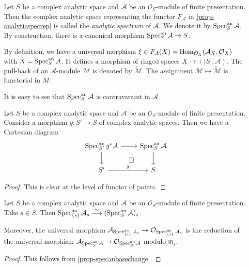 \begin{definition}
    Let $S$ be a complex analytic space and $\mathcal{A}$ be an $\mathcal{O}_S$-module of finite presentation. Then the complex analytic space representing the functor $F_{\mathcal{A}}$ in \cref{prop-analyticspecrep} is called the \emph{analytic spectrum} of $\mathcal{A}$. We denote it by $\operatorname{Spec}^{\mathrm{an}}_S \mathcal{A}$. By construction, there is a canonical morphism $\operatorname{Spec}^{\mathrm{an}}_S \mathcal{A}\rightarrow S$.

    By definition, we have a universal morphism $\xi\in F_{\mathcal{A}}(X)=\operatorname{Hom}_{\mathcal{O}_X}(\mathcal{A}_X,\mathcal{O}_X)$ with $X=\operatorname{Spec}^{\mathrm{an}}_S \mathcal{A}$. It defines a morphism of ringed spaces $X\rightarrow (|S|,\mathcal{A})$. The pull-back of an $\mathcal{A}$-module $\mathcal{M}$ is denoted by $\tilde{\mathcal{M}}$. The assignment $\mathcal{M}\mapsto \tilde{\mathcal{M}}$ is functorial in $M$.
\end{definition}
It is easy to see that $\operatorname{Spec}^{\mathrm{an}}_S \mathcal{A}$ is contravaraint in $\mathcal{A}$. 



\begin{proposition}\label{prop-specanbasechange}
    Let $S$ be a complex analytic space and $\mathcal{A}$ be an $\mathcal{O}_S$-module of finite presentation. Consider a morphism $g:S'\rightarrow S$ of complex analytic spaces. Then we have a Cartesian diagram
    \[
        \begin{tikzcd}
            \Spec^{\An}_{S'} g^*\mathcal{A} \arrow[d] \arrow[r] \arrow[rd, "\square", phantom] & \Spec^{\An}_S \mathcal{A} \arrow[d] \\
            S' \arrow[r, "g"]                                                                  & S                                  
        \end{tikzcd}
    \]
\end{proposition}
\begin{proof}
    This is clear at the level of functor of points.
\end{proof}

\begin{corollary}\label{cor-fiberspecan}
    Let $S$ be a complex analytic space and $\mathcal{A}$ be an $\mathcal{O}_S$-module of finite presentation. Take $s\in S$. Then $\operatorname{Spec}^{\mathrm{an}}_{\{s\}} \mathcal{A}_s\stackrel{\sim}{\longrightarrow} (\operatorname{Spec}^{\mathrm{an}}_S \mathcal{A})_s$. 
    
    Moreover, the universal morphism $\mathcal{A}_{\operatorname{Spec}^{\mathrm{an}}_{\{s\}} \mathcal{A}_s}\rightarrow \mathcal{O}_{\operatorname{Spec}^{\mathrm{an}}_{\{s\}} \mathcal{A}_s}$ is the reduction of the universal morphism $\mathcal{A}_{\operatorname{Spec}^{\mathrm{an}}_S \mathcal{A}}\rightarrow \mathcal{O}_{\operatorname{Spec}^{\mathrm{an}}_S \mathcal{A}}$ modulo $\mathfrak{m}_s$.
\end{corollary}
\begin{proof}
    This follows from \cref{prop-specanbasechange}.
\end{proof}


